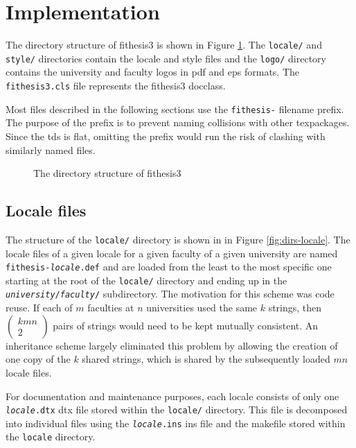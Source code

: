 \documentclass[digital,table,color]{fithesis3/fithesis3}
\begin{document}
  \section{Implementation}
  The directory structure of \textsf{fithesis3} is shown in Figure
  \ref{fig:dirs}. The \texttt{locale/} and \texttt{style/}
  directories contain the locale and style files and the
  \texttt{logo/} directory contains the university
  and faculty logos in \gls{pdf} and \gls{eps} formats. The
  \texttt{fithesis3.cls} file represents the \textsf{fithesis3}
  \gls{docclass}.
  
  Most files described in the following sections use the
  \texttt{fithesis-} filename prefix. The purpose of the prefix is
  to prevent naming collisions with other \glspl{texpackage}. Since
  the \gls{tds} is flat, omitting the prefix would run the risk of
  clashing with similarly named files.

  \begin{figure}
    \centering
    \parbox{0.5\textwidth}{}
    \caption{The directory structure of \textsf{fithesis3}}
    \label{fig:dirs}
  \end{figure}
  
  \subsection{Locale files}
  The structure of the \texttt{locale/} directory is shown in in
  Figure \ref{fig:dirs-locale}. The locale files of a given
  locale for a given faculty of a given university are named
  \texttt{fithesis-\textit{locale}.def} and are
  loaded from the least to the most specific one starting at the
  root of the \texttt{locale/} directory and ending up in the
  \texttt{\textit{university}/\textit{faculty}/}
  subdirectory. The motivation for this
  scheme was code reuse. If each of $m$ faculties at $n$
  universities used the same $k$ strings, then $(\begin{smallmatrix}
  kmn\\2\end{smallmatrix})$ pairs of strings would need to be kept
  mutually consistent. An inheritance scheme largely eliminated
  this problem by allowing the creation of one copy of the $k$
  shared strings, which is shared by the subsequently loaded $mn$
  locale files.

  For documentation and maintenance purposes, each locale consists
  of only one \texttt{\textit{locale}.dtx} \gls{dtx} file stored
  within the \texttt{locale/} directory. This file is decomposed
  into individual files using the \texttt{\textit{locale}.ins}
  \gls{ins} file and the \gls{makefile} stored within the
  \texttt{locale} directory.
\end{document}
